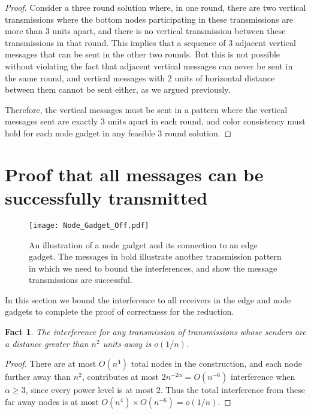 \documentclass{article}
\newtheorem{fact}[lemma]{Fact}
\begin{document}
\begin{proof}
Consider a three round solution where, in one round, there are two vertical transmissions where the bottom nodes participating in these transmissions are more than 3 units apart, and there is no vertical transmission between these transmissions in that round. This implies that a sequence of 3 adjacent vertical messages that can be sent in the other two rounds. But this is not possible without violating the fact that adjacent vertical messages can never be sent in the same round, and vertical messages with 2 units of horizontal distance between them cannot be sent either, as we argued previously.

Therefore, the vertical messages must be sent in a pattern where the vertical messages sent are exactly 3 units apart in each round, and color consistency must hold for each node gadget in any feasible 3 round solution.
\end{proof}



\section{Proof that all messages can be successfully transmitted}

\begin{figure}
\begin{center}
\texttt{[image: Node\_Gadget\_Off.pdf]}
\end{center}
\caption[Node gadget]{An illustration of a node gadget and its connection to an edge gadget.  The messages in bold illustrate another transmission pattern in which we need to bound the interferences, and show the message transmissions are successful.}
\label{fig:nodegadget}
\end{figure}

In this section we bound the interference to all receivers in the edge and node gadgets to complete the proof of correctness for the reduction.

\begin{fact}
The interference for any transmission of transmissions whose senders are a distance greater than $n^2$ units away is $o( 1/n )$.
\end{fact}
\begin{proof}
There are at most $O(n^4)$ total nodes in the construction, and each node further away than $n^2$, contributes at most $2 n^{-2\alpha} = O(n^{-6})$ interference when $\alpha\geq 3$, since every power level is at most $2$.  Thus the total interference from these far away nodes is at most $O(n^4) \times O(n^{-6}) = o(1/n)$.
\end{proof}
\end{document}
